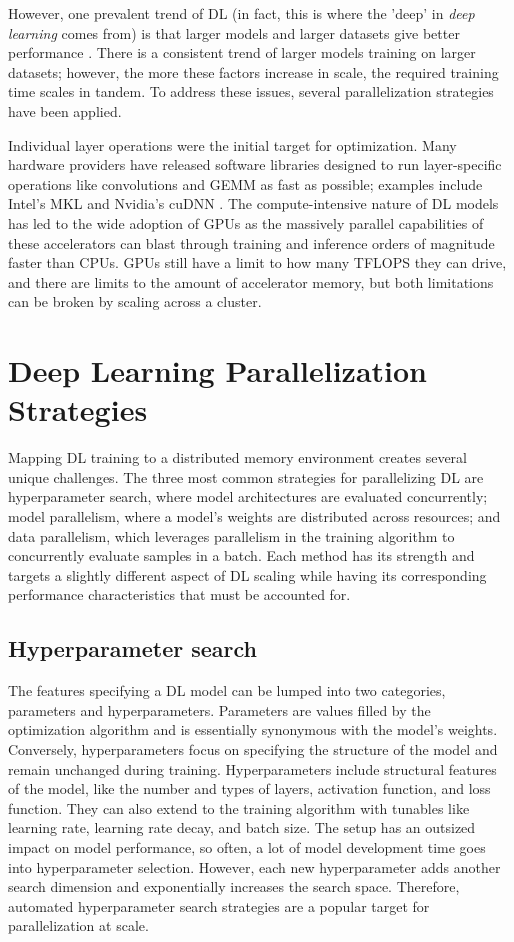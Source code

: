 However, one prevalent trend of \gls{DL} (in fact, this is where the 'deep' in \textit{deep learning} comes from) is that larger models and larger datasets give better performance \cite{Kaplan2020ScalingLawsForNLModels, Ben-Nun2019DemystifyDL}.
There is a consistent trend of larger models training on larger datasets; however, the more these factors increase in scale, the required training time scales in tandem.
To address these issues, several parallelization strategies have been applied.

Individual layer operations were the initial target for optimization. 
Many hardware providers have released software libraries designed to run layer-specific operations like convolutions and \gls{GEMM} as fast as possible; examples include Intel's MKL \cite{MKL} and Nvidia's cuDNN \cite{cuDNN}. 
The compute-intensive nature of \gls{DL} models has led to the wide adoption of \gls{GPU}s as the massively parallel capabilities of these accelerators can blast through training and inference orders of magnitude faster than \gls{CPU}s.
\gls{GPU}s still have a limit to how many T\gls{FLOPS} they can drive, and there are limits to the amount of accelerator memory, but both limitations can be broken by scaling across a cluster.

\section{Deep Learning Parallelization Strategies}
Mapping \gls{DL} training to a distributed memory environment creates several unique challenges.
The three most common strategies for parallelizing \gls{DL} are hyperparameter search, where model architectures are evaluated concurrently; model parallelism, where a model's weights are distributed across resources; and data parallelism, which leverages parallelism in the training algorithm to concurrently evaluate samples in a batch.
Each method has its strength and targets a slightly different aspect of \gls{DL} scaling while having its corresponding performance characteristics that must be accounted for.

\subsection{Hyperparameter search}
The features specifying a \gls{DL} model can be lumped into two categories, parameters and hyperparameters.
Parameters are values filled by the optimization algorithm and is essentially synonymous with the model's weights. 
Conversely, hyperparameters focus on specifying the structure of the model and remain unchanged during training.
Hyperparameters include structural features of the model, like the number and types of layers, activation function, and loss function. 
They can also extend to the training algorithm with tunables like learning rate, learning rate decay, and batch size.
The setup has an outsized impact on model performance, so often, a lot of model development time goes into hyperparameter selection. 
However, each new hyperparameter adds another search dimension and exponentially increases the search space.
Therefore, automated hyperparameter search strategies are a popular target for parallelization at scale.

